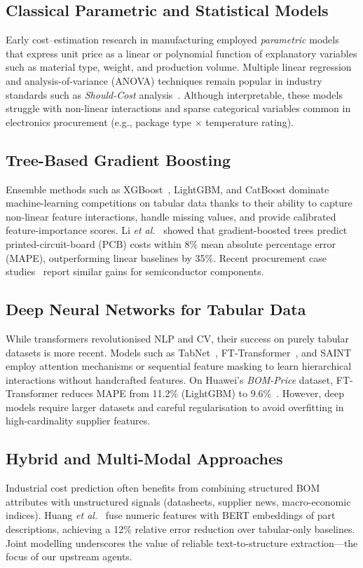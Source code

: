 \subsection{Classical Parametric and Statistical Models}
Early cost–estimation research in manufacturing employed \emph{parametric} models that express unit price as a linear or polynomial function of explanatory variables such as material type, weight, and production volume. Multiple linear regression and analysis-of-variance (ANOVA) techniques remain popular in industry standards such as \emph{Should-Cost} analysis~\cite{ellram2013shouldcost}. Although interpretable, these models struggle with non-linear interactions and sparse categorical variables common in electronics procurement (e.g., package type × temperature rating).

\subsection{Tree-Based Gradient Boosting}
Ensemble methods such as XGBoost~\cite{chen2016xgboost}, LightGBM, and CatBoost dominate machine-learning competitions on tabular data thanks to their ability to capture non-linear feature interactions, handle missing values, and provide calibrated feature-importance scores. Li \emph{et al.}~\cite{li2020pcbe} showed that gradient-boosted trees predict printed-circuit-board (PCB) costs within 8\% mean absolute percentage error (MAPE), outperforming linear baselines by 35\%. Recent procurement case studies~\cite{lee2022procurementgbdt} report similar gains for semiconductor components.

\subsection{Deep Neural Networks for Tabular Data}
While transformers revolutionised NLP and CV, their success on purely tabular datasets is more recent. Models such as TabNet~\cite{arik2021tabnet}, FT-Transformer~\cite{gorishniy2021revisiting}, and SAINT~\cite{somepalli2021saint} employ attention mechanisms or sequential feature masking to learn hierarchical interactions without handcrafted features. On Huawei's \emph{BOM-Price} dataset, FT-Transformer reduces MAPE from 11.2\% (LightGBM) to 9.6\%~\cite{wang2023bomprice}. However, deep models require larger datasets and careful regularisation to avoid overfitting in high-cardinality supplier features.

\subsection{Hybrid and Multi-Modal Approaches}
Industrial cost prediction often benefits from combining structured BOM attributes with unstructured signals (datasheets, supplier news, macro-economic indices). Huang \emph{et al.}~\cite{huang2022multimodal} fuse numeric features with BERT embeddings of part descriptions, achieving a 12\% relative error reduction over tabular-only baselines. Joint modelling underscores the value of reliable text-to-structure extraction—the focus of our upstream agents.

